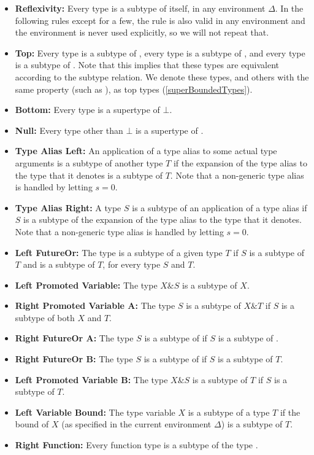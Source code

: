 \documentclass[makeidx]{article}
\begin{document}
{{\def\Item#1#2{\item[#1]{\textbf{#2:}}}
\begin{itemize}
\Item{\SrnReflexivity}{Reflexivity}
  Every type is a subtype of itself, in any environment $\Delta$.
  In the following rules except for a few,
  the rule is also valid in any environment
  and the environment is never used explicitly,
  so we will not repeat that.
\Item{\SrnTop}{Top}
  Every type is a subtype of ,
  every type is a subtype of \DYNAMIC,
  and every type is a subtype of \VOID.
  Note that this implies that these types are equivalent
  according to the subtype relation.
  We denote these types,
  and others with the same property (such as ),
  as top types
  (\ref{superBoundedTypes}).
\Item{\SrnBottom}{Bottom}
  Every type is a supertype of $\bot$.
\Item{\SrnNull}{Null}
  Every type other than $\bot$ is a supertype of .
\Item{\SrnLeftTypeAlias}{Type Alias Left}
  An application of a type alias to some actual type arguments is
  a subtype of another type $T$
  if the expansion of the type alias to the type that it denotes
  is a subtype of $T$.
  Note that a non-generic type alias is handled by letting $s = 0$.
\Item{\SrnRightTypeAlias}{Type Alias Right}
  A type $S$ is a subtype of an application of a type alias
  if $S$ is a subtype of
  the expansion of the type alias to the type that it denotes.
  Note that a non-generic type alias is handled by letting $s = 0$.
\Item{\SrnLeftFutureOr}{Left FutureOr}
  The type  is a subtype of a given type $T$
  if $S$ is a subtype of $T$ and  is a subtype of $T$,
  for every type $S$ and $T$.
\Item{\SrnTypeVariableReflexivityA}{Left Promoted Variable}
  The type $X \& S$ is a subtype of $X$.
\Item{\SrnRightPromotedVariable}{Right Promoted Variable A}
  The type $S$ is a subtype of $X \& T$ if
  $S$ is a subtype of both $X$ and $T$.
\Item{\SrnRightFutureOrA}{Right FutureOr A}
  The type $S$ is a subtype of  if
  $S$ is a subtype of .
\Item{\SrnRightFutureOrB}{Right FutureOr B}
  The type $S$ is a subtype of  if
  $S$ is a subtype of $T$.
\Item{\SrnLeftPromotedVariable}{Left Promoted Variable B}
  The type $X \& S$ is a subtype of $T$ if
  $S$ is a subtype of $T$.
\Item{\SrnLeftVariableBound}{Left Variable Bound}
  The type variable $X$ is a subtype of a type $T$ if
  the bound of $X$
  (as specified in the current environment $\Delta$)
  is a subtype of $T$.
\Item{\SrnRightFunction}{Right Function}
  Every function type is a subtype of the type \FUNCTION.

\end{itemize}}}
\end{document}
